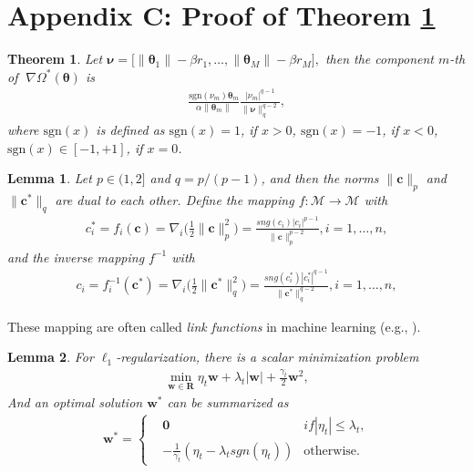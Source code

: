 \documentclass{article}
\newtheorem{lemma}{Lemma}
\newtheorem{theorem}{Theorem}
\begin{document}
\section{Appendix C: Proof of Theorem \ref{theorem-fenchel-dual}}
\begin{theorem}
\label{theorem-fenchel-dual}
Let
$
    \bm \nu=\Big[\|\pmb{\theta}_1\|-\beta r_1,\ldots,
    \|\pmb{\theta}_M\|-\beta r_M\Big],
$
then the component $m$-th of $\;\nabla\Omega^\ast(\pmb{\theta})$ is
\begin{align*}
\frac{\mathrm{sgn}(\nu_m) \pmb{\theta}_m}{\alpha\|\pmb{\theta}_m\|}
       \frac{|\nu_m|^{q-1}}{\|\bm \nu\|_q^{q-2}},
\end{align*}
where $\mathrm{sgn}(x)$ is defined as
$\mathrm{sgn}(x)=1$, if $x>0$, $\mathrm{sgn}(x)=-1$, if $x<0$,
$\mathrm{sgn}(x)\in[-1,+1]$, if $x=0$.
\end{theorem}
\begin{lemma}
  \label{inverse-mapping}
  Let $p \in (1,2]$ and $q=p/(p-1)$, and then the norms $\|\pmb{c}\|_p$ and $\|\pmb{c}^\ast\|_q$ are dual to each other. Define the mapping $f:\mathcal{M} \to \mathcal{M}$ with
  \begin{align*}
    c_i^\ast=f_i(\pmb{c})=\nabla_i\Big(\frac{1}{2}\|\pmb{c}\|_p^2\Big)=\frac{sng(c_i)|c_i|^{p-1}}{\|\pmb{c}\|_p^{p-2}}, i=1,\ldots,n,
  \end{align*}
and the inverse mapping $f^{-1}$ with
  \begin{align*}
    c_i=f^{-1}_i(\pmb{c}^\ast)=\nabla_i\Big(\frac{1}{2}\|\pmb{c}^\ast\|_q^2\Big)=\frac{sng(c_i^\ast)|c_i^\ast|^{q-1}}{\|\pmb{c}^\ast\|_q^{q-2}}, i=1,\ldots,n,
  \end{align*}
\end{lemma}
These mapping are often called {\em link functions} in machine learning (e.g., \cite{Gentile03a}).
\begin{lemma}
\label{lemma-lemma7}
For $\ell_1$-regularization, there is a scalar minimization problem
  \begin{align*}
    \min\limits_{\mathbf w \in \mathbf{R}} \eta_t\mathbf w+\lambda_t|\mathbf w|+\frac{\gamma_t}{2}\mathbf w^2,
  \end{align*}
And an optimal solution $\mathbf w^\ast$ can be summarized as
  \begin{align*}
    \mathbf w^\ast=\left\{
        \begin{aligned}
        &\mathbf{0}  &if |\eta_t| \leq \lambda_t,\\
        &-\frac{1}{\gamma_t}(\eta_t-\lambda_t sgn(\eta_t)) &\textrm{otherwise}.
        \end{aligned}
    \right.
  \end{align*}
\end{lemma}
\end{document}
